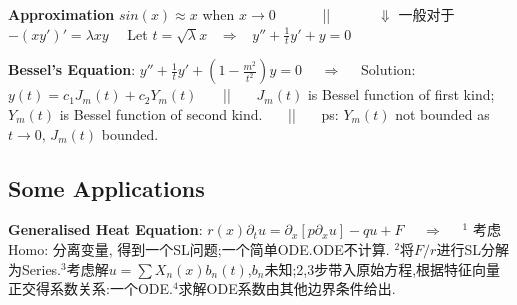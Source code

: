 \documentclass[8pt]{extarticle}
\begin{document}
\textbf{Approximation} $sin(x)\approx x$ when $x\to0$ \ \ \ \ \ \ || \ \ \ \ \ \ $\Downarrow$ 一般对于$-(xy')'=\lambda xy$ \ \ Let $t=\sqrt{\lambda}x$ \ $\Rightarrow$ \ $y''+\frac{1}{t}y'+y=0$

\textbf{Bessel's Equation}: $y''+\frac{1}{t}y'+(1-\frac{m^2}{t^2})y=0$ \ \ $\Rightarrow$ \ \ Solution: $y(t)=c_1J_m(t)+c_2Y_m(t)$ \ \ \ || \ \ \ $J_m(t)$ is Bessel function of first kind; $Y_m(t)$ is Bessel function of second kind. \ \ \ || \ \ \ ps: $Y_m(t)$ not bounded as $t\to0$, $J_m(t)$ bounded.



\subsection{Some Applications}

\tiny

\textbf{Generalised Heat Equation}: $r(x)\partial_tu=\partial_x[p\partial_xu]-qu+F$ \ \ $\Rightarrow$ \ \ {\tiny $^1$ 考虑Homo: 分离变量, 得到一个SL问题;一个简单ODE.ODE不计算. $^2$将$F/r$进行SL分解为Series.$^3$考虑解$u=\sum X_n(x)b_n(t)$,$b_n$未知;2,3步带入原始方程,根据特征向量正交得系数关系:一个ODE.$^4$求解ODE系数由其他边界条件给出.}
\end{document}

